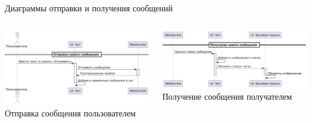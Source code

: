 \documentclass[aspectratio=169]{beamer}
\begin{document}
\begin{frame}{Диаграммы отправки и получения сообщений}
\vspace{0.5em}

\begin{columns}
    \begin{column}{0.5\textwidth}
        \centering
        \includegraphics[width=0.95\linewidth]{static/MessageSendDiagram.png} \\
        \small Отправка сообщения пользователем
    \end{column}
    \begin{column}{0.5\textwidth}
        \centering
        \includegraphics[width=0.95\linewidth]{static/MessageReceiveDiagram.png} \\
        \small Получение сообщения получателем
    \end{column}
\end{columns}
\end{frame}

%
\end{document}
